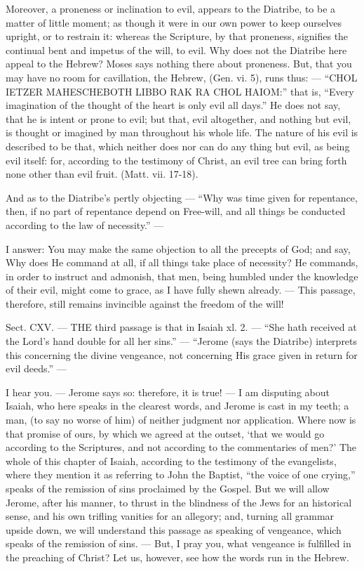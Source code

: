Moreover, a proneness or inclination to evil, appears to the Diatribe, to be a matter of little moment; as though it were in our own power to keep ourselves upright, or to restrain it: whereas the Scripture, by that proneness, signifies the continual bent and impetus of the will, to evil. Why does not the Diatribe here appeal to the Hebrew? Moses says nothing there about proneness. But, that you may have no room for cavillation, the Hebrew, (Gen. vi. 5), runs thus: — “\textsc{CHOL IETZER MAHESCHEBOTH LIBBO RAK RA CHOL HAIOM}:” that is, “Every imagination of the thought of the heart is only evil all days.” He does not say, that he is intent or prone to evil; but that, evil altogether, and nothing but evil, is thought or imagined by man throughout his whole life. The nature of his evil is described to be that, which neither does nor can do any thing but evil, as being evil itself: for, according to the testimony of Christ, an evil tree can bring forth none other than evil fruit. (Matt. vii. 17-18).

And as to the Diatribe’s pertly objecting — “Why was time given for repentance, then, if no part of repentance depend on Free-will, and all things be conducted according to the law of necessity.” —

I answer: You may make the same objection to all the precepts of God; and say, Why does He command at all, if all things take place of necessity? He commands, in order to instruct and admonish, that men, being humbled under the knowledge of their evil, might come to grace, as I have fully shewn already. — This passage, therefore, still remains invincible against the freedom of the will!


Sect. CXV. — THE third passage is that in Isaiah xl. 2. — “She hath received at the Lord’s hand double for all her sins.” — “Jerome (says the Diatribe) interprets this concerning the divine vengeance, not concerning His grace given in return for evil deeds.” —

I hear you. — Jerome says so: therefore, it is true! — I am disputing about Isaiah, who here speaks in the clearest words, and Jerome is cast in my teeth; a man, (to say no worse of him) of neither judgment nor application. Where now is that promise of ours, by which we agreed at the outset, ‘that we would go according to the Scriptures, and not according to the commentaries of men?’ The whole of this chapter of Isaiah, according to the testimony of the evangelists, where they mention it as referring to John the Baptist, “the voice of one crying,” speaks of the remission of sins proclaimed by the Gospel. But we will allow Jerome, after his manner, to thrust in the blindness of the Jews for an historical sense, and his own trifling vanities for an allegory; and, turning all grammar upside down, we will understand this passage as speaking of vengeance, which speaks of the remission of sins. — But, I pray you, what vengeance is fulfilled in the preaching of Christ? Let us, however, see how the words run in the Hebrew.

